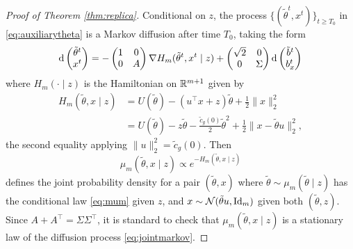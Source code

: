 \begin{proof}[Proof of Theorem \ref{thm:replica}]
Conditional on $z$, the process $\{(\tilde \theta^t,x^t)\}_{t \geq T_0}$ in
\eqref{eq:auxiliarytheta} is a Markov diffusion after time $T_0$, taking
the form
\begin{equation}\label{eq:jointmarkov}
\mathrm{d} \begin{pmatrix} \tilde \theta^t \\ x^t \end{pmatrix}
={-}\begin{pmatrix} 1 & 0 \\ 0 & A \end{pmatrix}
\nabla H_m(\tilde\theta^t,x^t \mid z)+\begin{pmatrix} \sqrt{2} & 0 \\ 0 &
\Sigma \end{pmatrix} \mathrm{d}\begin{pmatrix} \tilde b^t \\ b_x^t
\end{pmatrix}
\end{equation}
where $H_m(\cdot \mid z)$ is the Hamiltonian on $\mathbb{R}^{m+1}$ given by
\begin{align*}
H_m(\tilde\theta,x \mid z)&=U(\tilde\theta)-(u^\top x+z)\tilde\theta+\frac{1}{2}\|x\|_2^2\\
&=U(\tilde\theta)-z\tilde\theta-\frac{\tilde c_g(0)}{2}\tilde\theta^2+\frac{1}{2}\|x-\tilde\theta u\|_2^2,
\end{align*}
the second equality applying $\|u\|_2^2=\tilde c_g(0)$. Then
\[\mu_m(\tilde\theta,x \mid z) \propto e^{-H_m(\tilde\theta,x \mid z)}\]
defines the joint probability density for a pair $(\tilde\theta,x)$ where
$\tilde\theta \sim \mu_m(\tilde\theta \mid z)$ has the conditional
law \eqref{eq:mum} given $z$, and $x \sim \mathcal{N}(\tilde\theta u,\mathrm{Id}_m)$
given both $(\tilde\theta,z)$. Since $A+A^\top=\Sigma\Sigma^\top$,
it is standard to check that $\mu_m(\tilde\theta,x \mid z)$
is a stationary law of the diffusion process \eqref{eq:jointmarkov}.


\end{proof}
